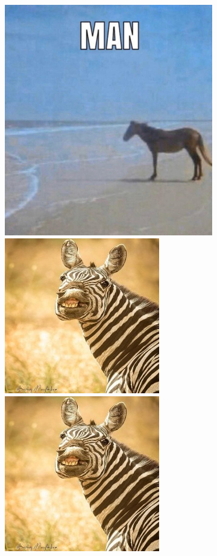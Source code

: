 \documentclass[12pt, fleqn, titlepage]{article}
\newcommand\skipper{1.4pt}
\begin{document}
\begin{figure}[H]
\begin{subfigure}[b]{0.8\textwidth}
		\hskip\skipper
		\includegraphics[width=0.15\linewidth]{imgs/temp_horse}
		\hskip\skipper
		\includegraphics[width=0.15\linewidth]{imgs/temp_zebra}
		\hskip\skipper
		\includegraphics[width=0.15\linewidth]{imgs/temp_zebra}
	\end{subfigure}
\end{figure}
\end{document}
